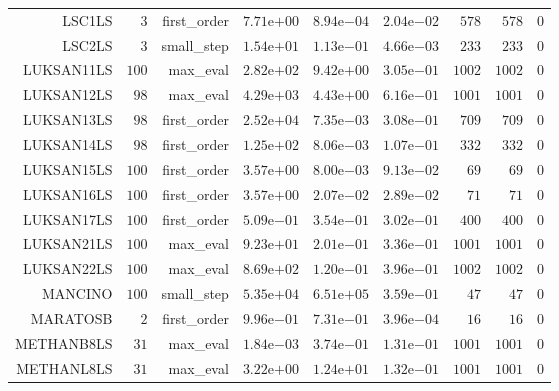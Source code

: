 \begin{longtable}{rrrrrrrrr}
LSC1LS & \(     3\) & first\_order & \( 7.71\)e\(+00\) & \( 8.94\)e\(-04\) & \( 2.04\)e\(-02\) & \(   578\) & \(   578\) & \(     0\) \\
LSC2LS & \(     3\) & small\_step & \( 1.54\)e\(+01\) & \( 1.13\)e\(-01\) & \( 4.66\)e\(-03\) & \(   233\) & \(   233\) & \(     0\) \\
LUKSAN11LS & \(   100\) & max\_eval & \( 2.82\)e\(+02\) & \( 9.42\)e\(+00\) & \( 3.05\)e\(-01\) & \(  1002\) & \(  1002\) & \(     0\) \\
LUKSAN12LS & \(    98\) & max\_eval & \( 4.29\)e\(+03\) & \( 4.43\)e\(+00\) & \( 6.16\)e\(-01\) & \(  1001\) & \(  1001\) & \(     0\) \\
LUKSAN13LS & \(    98\) & first\_order & \( 2.52\)e\(+04\) & \( 7.35\)e\(-03\) & \( 3.08\)e\(-01\) & \(   709\) & \(   709\) & \(     0\) \\
LUKSAN14LS & \(    98\) & first\_order & \( 1.25\)e\(+02\) & \( 8.06\)e\(-03\) & \( 1.07\)e\(-01\) & \(   332\) & \(   332\) & \(     0\) \\
LUKSAN15LS & \(   100\) & first\_order & \( 3.57\)e\(+00\) & \( 8.00\)e\(-03\) & \( 9.13\)e\(-02\) & \(    69\) & \(    69\) & \(     0\) \\
LUKSAN16LS & \(   100\) & first\_order & \( 3.57\)e\(+00\) & \( 2.07\)e\(-02\) & \( 2.89\)e\(-02\) & \(    71\) & \(    71\) & \(     0\) \\
LUKSAN17LS & \(   100\) & first\_order & \( 5.09\)e\(-01\) & \( 3.54\)e\(-01\) & \( 3.02\)e\(-01\) & \(   400\) & \(   400\) & \(     0\) \\
LUKSAN21LS & \(   100\) & max\_eval & \( 9.23\)e\(+01\) & \( 2.01\)e\(-01\) & \( 3.36\)e\(-01\) & \(  1001\) & \(  1001\) & \(     0\) \\
LUKSAN22LS & \(   100\) & max\_eval & \( 8.69\)e\(+02\) & \( 1.20\)e\(-01\) & \( 3.96\)e\(-01\) & \(  1002\) & \(  1002\) & \(     0\) \\
MANCINO & \(   100\) & small\_step & \( 5.35\)e\(+04\) & \( 6.51\)e\(+05\) & \( 3.59\)e\(-01\) & \(    47\) & \(    47\) & \(     0\) \\
MARATOSB & \(     2\) & first\_order & \( 9.96\)e\(-01\) & \( 7.31\)e\(-01\) & \( 3.96\)e\(-04\) & \(    16\) & \(    16\) & \(     0\) \\
METHANB8LS & \(    31\) & max\_eval & \( 1.84\)e\(-03\) & \( 3.74\)e\(-01\) & \( 1.31\)e\(-01\) & \(  1001\) & \(  1001\) & \(     0\) \\
METHANL8LS & \(    31\) & max\_eval & \( 3.22\)e\(+00\) & \( 1.24\)e\(+01\) & \( 1.32\)e\(-01\) & \(  1001\) & \(  1001\) & \(     0\) \\

\end{longtable}
